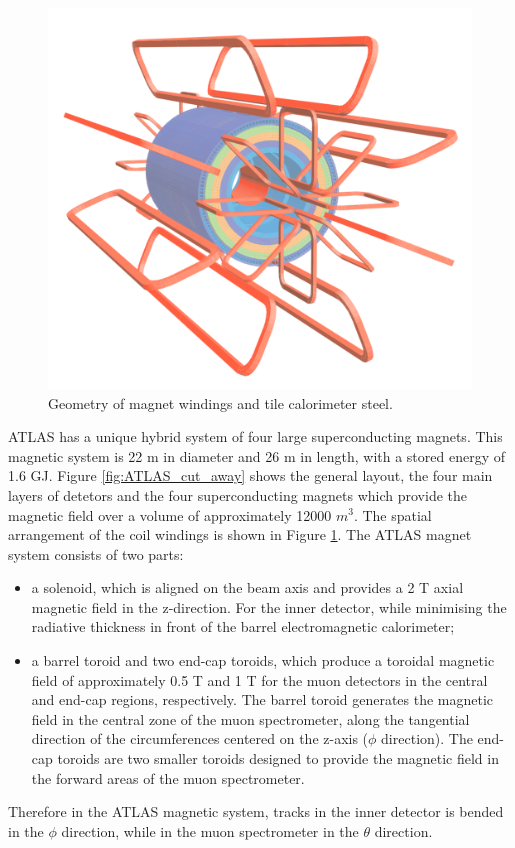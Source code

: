 \documentclass[letterpaper,12pt]{article}
\begin{document}
	\begin{figure}[]
		\begin{centering}	
		\includegraphics[width=.4\textwidth]{Detector_plots/ATLAS magnets.png}
		\caption{Geometry of magnet windings and
		tile calorimeter steel.	}
		\label{fig:ATLAS_magnets}
		\end{centering}
	\end{figure}

	ATLAS has a unique hybrid system of four large superconducting 
	magnets. This magnetic system is 22 m in diameter and 26 m in length, 
	with a stored energy of 1.6 GJ.
	Figure \ref{fig:ATLAS_cut_away} shows the general layout, 
	the four main layers of detetors and the four superconducting 
	magnets which provide the magnetic
	field over a volume of approximately 12000 $m^3$.
	The spatial arrangement of the coil windings is shown in 
	Figure \ref{fig:ATLAS_magnets}. 
	The ATLAS magnet system consists of two parts:
	\begin{itemize}
		\item a solenoid, which is aligned on the beam axis and 
		provides a 2 T axial magnetic field in the z-direction. 
		For the inner detector, while minimising 
		the radiative thickness in front of the	barrel 
		electromagnetic calorimeter;
		\item  a barrel toroid and two end-cap toroids, 
		which produce a	toroidal magnetic field of approximately 
		0.5 T and 1 T for the muon detectors in the central 
		and end-cap regions, respectively. 
		The barrel toroid generates the magnetic field in the central zone 
		of the muon spectrometer, along the tangential direction of 
		the circumferences centered on the z-axis ($\phi$ direction). 
		The end-cap toroids are two smaller toroids designed to 
		provide the magnetic field in the forward areas of 
		the muon spectrometer. 
		
		
	\end{itemize}		
	Therefore in the ATLAS magnetic system, tracks in the inner detector
	is bended in the $\phi$ direction, while in the muon spectrometer 
	in the $\theta$ direction.
	
\end{document}
